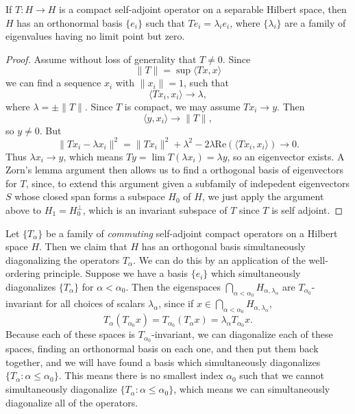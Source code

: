 \begin{theorem}
    If $T: H \to H$ is a compact self-adjoint operator on a separable Hilbert space, then $H$ has an orthonormal basis $\{ e_i \}$ such that $Te_i = \lambda_i e_i$, where $\{ \lambda_i \}$ are a family of eigenvalues having no limit point but zero.
\end{theorem}
\begin{proof}
    Assume without loss of generality that $T \neq 0$. Since
    \[ \| T \| = \sup \langle Tx, x \rangle \]
    we can find a sequence $x_i$ with $\| x_i \| = 1$, such that
    \[ \langle Tx_i, x_i \rangle \to \lambda, \]
    where $\lambda = \pm \| T \|$. Since $T$ is compact, we may assume $Tx_i \to y$. Then
    \[ \langle y, x_i \rangle \to \| T \|, \]
    so $y \neq 0$. But
    \[ \| Tx_i - \lambda x_i \|^2 = \| Tx_i \|^2 + \lambda^2 - 2 \lambda \text{Re}( \langle Tx_i, x_i \rangle ) \to 0. \]
    Thus $\lambda x_i \to y$, which means $T y = \lim T(\lambda x_i) = \lambda y$, so an eigenvector exists. A Zorn's lemma argument then allows us to find a orthogonal basis of eigenvectors for $T$, since, to extend this argument given a subfamily of indepedent eigenvectors $S$ whose closed span forms a subspace $H_0$ of $H$, we just apply the argument above to $H_1 = H_0^\perp$, which is an invariant subspace of $T$ since $T$ is self adjoint.
\end{proof}

Let $\{ T_\alpha \}$ be a family of \emph{commuting} self-adjoint compact operators on a Hilbert space $H$. Then we claim that $H$ has an orthogonal basis simultaneously diagonalizing the operators $T_\alpha$. We can do this by an application of the well-ordering principle. Suppose we have a basis $\{ e_i \}$ which simultaneously diagonalizes $\{ T_\alpha \}$ for $\alpha < \alpha_0$. Then the eigenspaces $\bigcap_{\alpha < \alpha_0} H_{\alpha,\lambda_\alpha}$ are $T_{\alpha_0}$-invariant for all choices of scalars $\lambda_\alpha$, since if $x \in \bigcap_{\alpha < \alpha_0} H_{\alpha,\lambda_\alpha}$,
%
\[ T_\alpha (T_{\alpha_0} x) = T_{\alpha_0} (T_\alpha x) = \lambda_\alpha T_{\alpha_0} x. \]
%
Because each of these spaces is $T_{\alpha_0}$-invariant, we can diagonalize each of these spaces, finding an orthonormal basis on each one, and then put them back together, and we will have found a basis which simultaneously diagonalizes $\{ T_\alpha : \alpha \leq \alpha_0 \}$. This means there is no smallest index $\alpha_0$ such that we cannot simultaneously diagonalize $\{ T_\alpha : \alpha \leq \alpha_0 \}$, which means we can simultaneously diagonalize all of the operators.

